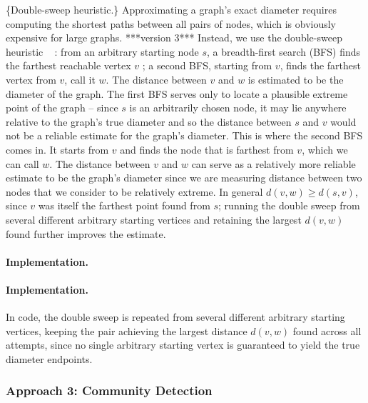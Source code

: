 \documentclass[a4paper,12pt]{amsart}
\numberwithin{equation}{section}
\begin{document}
\{Double-sweep heuristic.\} Approximating a graph's exact diameter requires computing the shortest paths between all pairs of nodes, which is obviously expensive for large graphs. ***version 3*** Instead, we use the double-sweep heuristic ~\citep{crescenzi2010finding} : from an arbitrary starting node $s$, a breadth-first search (BFS) finds the farthest reachable vertex $v$ ; a second BFS, starting from $v$, finds the farthest vertex from $v$, call it $w$. The distance between $v$ and $w$ is estimated to be the diameter of the graph.
    The first BFS serves only to locate a plausible extreme point of the graph -- since $s$ is an arbitrarily chosen node, it may lie anywhere relative to the graph's true diameter and so the distance between $s$ and $v$ would not be a reliable estimate for the graph's diameter.  This is where the second BFS comes in. It starts from $v$ and finds the node that is farthest from $v$, which we can call $w$. The distance between $v$ and $w$
can serve as a relatively more reliable estimate to be the graph's diameter since we are measuring distance between two nodes that we consider to be relatively extreme. In general $d(v,w) \geq d(s,v)$, since $v$ was itself the farthest 
point found from $s$; running the double sweep from several different 
arbitrary starting vertices and retaining the largest $d(v,w)$ found 
further improves the estimate.
\paragraph{Implementation.} \paragraph{Implementation.} In code, the double sweep is repeated from 
several different arbitrary starting vertices, keeping the pair 
achieving the largest distance $d(v,w)$ found across all attempts, 
since no single arbitrary starting vertex is guaranteed to yield the 
true diameter endpoints.
\subsubsection{Approach 3: Community Detection}
\end{document}
